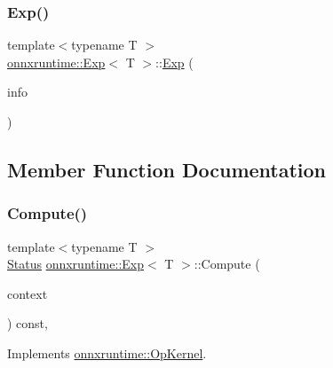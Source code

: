 \subsubsection{\texorpdfstring{Exp()}{Exp()}}
{\footnotesize\ttfamily template$<$typename T $>$ \\
\mbox{\hyperlink{classonnxruntime_1_1Exp}{onnxruntime\+::\+Exp}}$<$ T $>$\+::\mbox{\hyperlink{classonnxruntime_1_1Exp}{Exp}} (\begin{DoxyParamCaption}\item[{const \mbox{\hyperlink{classonnxruntime_1_1OpKernelInfo}{Op\+Kernel\+Info}} \&}]{info }\end{DoxyParamCaption})\hspace{0.3cm}{\ttfamily [inline]}}



\subsection{Member Function Documentation}
\mbox{\label{classonnxruntime_1_1Exp_afc72392b8a866954f0cd6d60733afee9}} 
\subsubsection{\texorpdfstring{Compute()}{Compute()}\hspace{0.1cm}{\footnotesize\ttfamily [1/2]}}
{\footnotesize\ttfamily template$<$typename T $>$ \\
\mbox{\hyperlink{classonnxruntime_1_1common_1_1Status}{Status}} \mbox{\hyperlink{classonnxruntime_1_1Exp}{onnxruntime\+::\+Exp}}$<$ T $>$\+::Compute (\begin{DoxyParamCaption}\item[{\mbox{\hyperlink{classonnxruntime_1_1OpKernelContext}{Op\+Kernel\+Context}} $\ast$}]{context }\end{DoxyParamCaption}) const\hspace{0.3cm}{\ttfamily [override]}, {\ttfamily [virtual]}}



Implements \mbox{\hyperlink{classonnxruntime_1_1OpKernel_a9eca8656a78b1b3ab9d3351a12798650}{onnxruntime\+::\+Op\+Kernel}}.

\mbox{\label{classonnxruntime_1_1Exp_a8ce36e7e71fd7ab9c81bb09e27ba1b8e}} 
